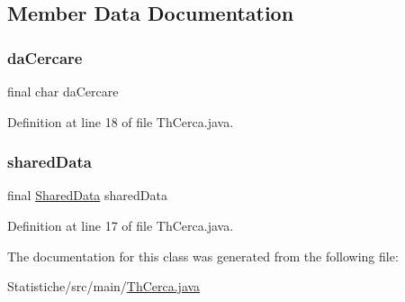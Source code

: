 \subsection{Member Data Documentation}
\mbox{\label{classmain_1_1_th_cerca_a05008a7b42b41e8cb77230f70da26619}} 
\subsubsection{\texorpdfstring{da\+Cercare}{daCercare}}
{\footnotesize\ttfamily final char da\+Cercare\hspace{0.3cm}{\ttfamily [private]}}



Definition at line 18 of file Th\+Cerca.\+java.

\mbox{\label{classmain_1_1_th_cerca_ac5f1128ef8d0ba91a8214e03732e2662}} 
\subsubsection{\texorpdfstring{shared\+Data}{sharedData}}
{\footnotesize\ttfamily final \mbox{\hyperlink{classmain_1_1_shared_data}{Shared\+Data}} shared\+Data\hspace{0.3cm}{\ttfamily [private]}}



Definition at line 17 of file Th\+Cerca.\+java.



The documentation for this class was generated from the following file\+:\begin{DoxyCompactItemize}
\item 
Statistiche/src/main/\mbox{\hyperlink{_th_cerca_8java}{Th\+Cerca.\+java}}\end{DoxyCompactItemize}
